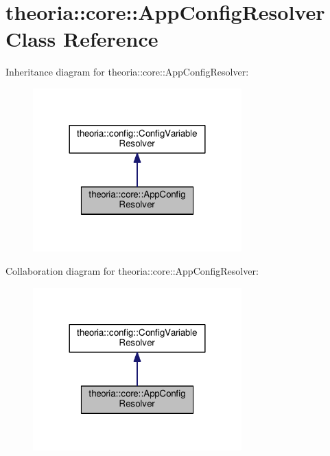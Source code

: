 \hypertarget{classtheoria_1_1core_1_1AppConfigResolver}{}\section{theoria\+:\+:core\+:\+:App\+Config\+Resolver Class Reference}
\label{classtheoria_1_1core_1_1AppConfigResolver}


Inheritance diagram for theoria\+:\+:core\+:\+:App\+Config\+Resolver\+:
\nopagebreak
\begin{figure}[H]
\begin{center}
\leavevmode
\includegraphics[width=228pt]{classtheoria_1_1core_1_1AppConfigResolver__inherit__graph}
\end{center}
\end{figure}


Collaboration diagram for theoria\+:\+:core\+:\+:App\+Config\+Resolver\+:
\nopagebreak
\begin{figure}[H]
\begin{center}
\leavevmode
\includegraphics[width=228pt]{classtheoria_1_1core_1_1AppConfigResolver__coll__graph}
\end{center}
\end{figure}
